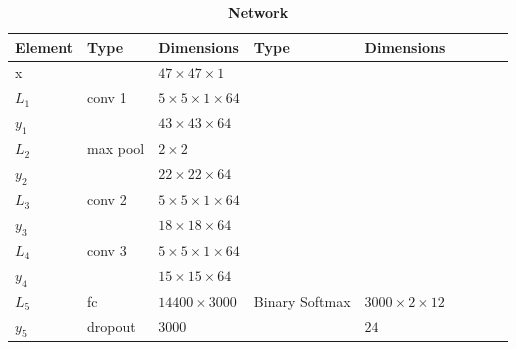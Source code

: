 \begin{table}[h!]
	\centering
	\caption*{\textbf{Network \networkIV}}
	{\footnotesize
		\begin{tabular}{|lllllllll|}
			\hline
			\multicolumn{1}{|l|}{Element} & Type             & \multicolumn{1}{l|}{Dimensions}                  & Type           & \multicolumn{1}{l|}{Dimensions}            \\ \hline
			\multicolumn{1}{|l|}{x}       &                  & \multicolumn{1}{l|}{$47\times47\times1$}         &                & \multicolumn{1}{l|}{}                      \\ \hline

			\multicolumn{1}{|l|}{$L_1$}   & conv 1           & \multicolumn{1}{l|}{$5\times 5\times1\times 64$} &                & \multicolumn{1}{l|}{}                      \\
			\multicolumn{1}{|l|}{$y_1$}   &                  & \multicolumn{1}{l|}{$43\times43\times64$}        &                & \multicolumn{1}{l|}{}                      \\ \hline

			\multicolumn{1}{|l|}{$L_2$}   & max pool         & \multicolumn{1}{l|}{$2\times 2$}                 &                & \multicolumn{1}{l|}{}                      \\
			\multicolumn{1}{|l|}{$y_2$}   &                  & \multicolumn{1}{l|}{$22\times22\times 64$}       &                & \multicolumn{1}{l|}{}                      \\ \hline

			\multicolumn{1}{|l|}{$L_3$}   & conv 2           & \multicolumn{1}{l|}{$5\times 5\times1\times 64$} &                & \multicolumn{1}{l|}{}                      \\
			\multicolumn{1}{|l|}{$y_3$}   &                  & \multicolumn{1}{l|}{$18\times18\times64$}        &                & \multicolumn{1}{l|}{}                      \\ \hline

			\multicolumn{1}{|l|}{$L_4$}   & conv 3           & \multicolumn{1}{l|}{$5\times 5\times1\times 64$} &                & \multicolumn{1}{l|}{}                      \\
			\multicolumn{1}{|l|}{$y_4$}   &                  & \multicolumn{1}{l|}{$15\times15\times64$}        &                & \multicolumn{1}{l|}{}                      \\ \hline

			\multicolumn{1}{|l|}{$L_5$}   & fc               & \multicolumn{1}{l|}{$14400\times3000$}           & Binary Softmax & \multicolumn{1}{l|}{$3000\times2\times12$} \\
			\multicolumn{1}{|l|}{$y_5$}   & dropout          & \multicolumn{1}{l|}{$3000$}                      &                & \multicolumn{1}{l|}{$24$}                  \\ \hline


\end{tabular}}
\end{table}
